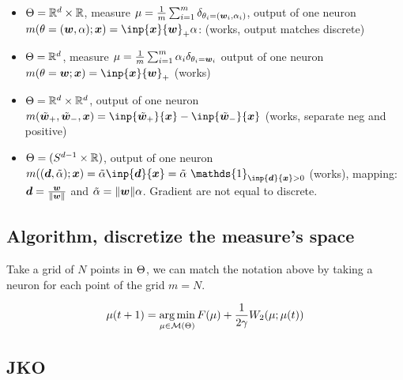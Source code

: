 \begin{itemize}
	\item $\Theta = \mathbb{R}^d \times \mathbb{R}$, measure $\mu = \frac{1}{m} \sum_{i=1}^{m} \delta_{\theta_i = ({\bm{w}}_i, \alpha_i)}$, output of one neuron $m(\param=(\vw,\alpha); \vx) = \inp{\vx}{\vw}_+ \alpha$: (works, output matches discrete)
	\item $\Theta = \mathbb{R}^d$, measure $\mu = \frac{1}{m} \sum_{i=1}^{m} \alpha_i \delta_{\theta_i = {\bm{w}}_i}$ output of one neuron $m(\param=\vw; \vx) = \inp{\vx}{\vw}_+$ (works)
	\item $\Theta = \mathbb{R}^d \times \mathbb{R}^d$, output of one neuron $m(\tilde{\vw}_+, \tilde{\vw}_-, \vx) = \inp{\tilde{\vw}_+}{\vx} - \inp{\tilde{\vw}_-}{\vx}$ (works, separate neg and positive)
	\item $\Theta = (S^{d-1} \times \mathbb{R})$, output of one neuron $m((\vd, \tilde{\alpha}); \vx) = \tilde{\alpha} \inp{\vd}{\vx} = \tilde{\alpha}\  \mathds{1}_{\inp{\vd}{\vx}>0} $ (works), mapping: ${\bm{d}} = \frac{{\bm{w}}}{\lVert{\bm{w}}\rVert}$ and $\tilde{\alpha}=\lVert{\bm{w}}\rVert \alpha$. Gradient are not equal to discrete.
\end{itemize}

\subsection{Algorithm, discretize the measure's space}

Take a grid of $N$ points in $\Theta$, we can match the notation above by taking a neuron for each point of the grid $m=N$.

\begin{equation}
	\mu(t+1) = \operatorname*{arg\,min}_{\mu \in \mathcal{M}(\Theta)} F(\mu) + \frac{1}{2 \gamma} W_2(\mu; \mu(t))
\end{equation}




\subsection{JKO}


